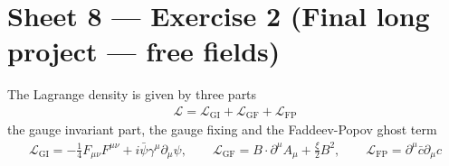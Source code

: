 \documentclass[10pt,a4paper]{report}
\theoremstyle{definition}
\begin{document}
\section{Sheet 8 — Exercise 2 (Final long project — free fields)}
The Lagrange density is given by three parts 
\begin{align}
\mathcal{L}
=\mathcal{L}_\text{GI}
+\mathcal{L}_\text{GF}
+\mathcal{L}_\text{FP}
\end{align}
the gauge invariant part, the gauge fixing and the Faddeev-Popov ghost term 
\begin{align}
\mathcal{L}_\text{GI} = -\frac{1}{4}F_{\mu\nu}F^{\mu\nu}+i\bar{\psi}\gamma^\mu\partial_\mu\psi,
\qquad
\mathcal{L}_\text{GF} = B\cdot\partial^\mu A_\mu+\frac{\xi}{2}B^2,
\qquad
\mathcal{L}_\text{FP} = \partial^\mu\bar{c}\partial_\mu c 
\end{align}
\end{document}
